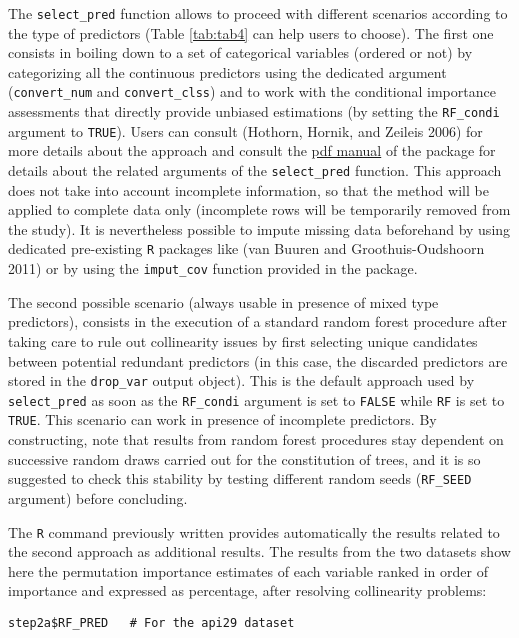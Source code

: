The \texttt{select\_pred} function allows to proceed with different scenarios according to the type of predictors (Table \ref{tab:tab4} can help users to choose). The first one consists in boiling down to a set of categorical variables (ordered or not) by categorizing all the continuous predictors using the dedicated argument (\texttt{convert\_num} and \texttt{convert\_clss}) and to work with the conditional importance assessments that directly provide unbiased estimations (by setting the \texttt{RF\_condi} argument to \texttt{TRUE}). Users can consult (Hothorn, Hornik, and Zeileis 2006) for more details about the approach and consult the \href{https://cran.r-project.org//web//packages//OTrecod//OTrecod.pdf}{pdf manual} of the package for details about the related arguments of the \texttt{select\_pred} function.
This approach does not take into account incomplete information, so that the method will be applied to complete data only (incomplete rows will be temporarily removed from the study). It is nevertheless possible to impute missing data beforehand by using dedicated pre-existing \texttt{R} packages like  (van Buuren and Groothuis-Oudshoorn 2011) or by using the \texttt{imput\_cov} function provided in the  package.

The second possible scenario (always usable in presence of mixed type predictors), consists in the execution
of a standard random forest procedure after taking care to rule out collinearity issues by first selecting unique candidates between potential redundant predictors (in this case, the discarded predictors are stored in the \texttt{drop\_var} output object). This is the default approach used by \texttt{select\_pred} as soon as the \texttt{RF\_condi}
argument is set to \texttt{FALSE} while \texttt{RF} is set to \texttt{TRUE}. This scenario can work in presence of incomplete predictors. By constructing, note that results from random forest procedures stay dependent on successive random draws carried out for the constitution of trees, and it is so suggested to check this stability by testing different random seeds (\texttt{RF\_SEED} argument) before concluding.

The \texttt{R} command previously written provides automatically the results related to the second approach as
additional results. The results from the two datasets show here the permutation importance estimates of each
variable ranked in order of importance and expressed as percentage, after resolving collinearity problems:

\begin{verbatim}
step2a$RF_PRED   # For the api29 dataset
\end{verbatim}

